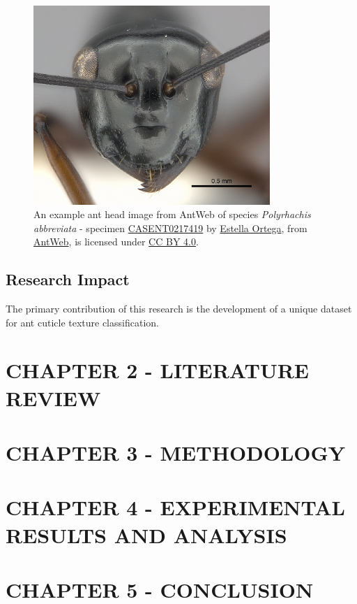 \documentclass[12pt]{article}
\begin{document}
\begin{figure}[ht]
    \centering
    \includegraphics[width=0.8\textwidth]{assets/images/CASENT0217419.jpg}
    \caption{ An example ant head image from AntWeb of species
        \textit{Polyrhachis abbreviata} - specimen
        \href{https://www.antweb.org/bigPicture.do?name=casent0217419&shot=h&number=1}{CASENT0217419}
        by \href{https://www.antweb.org/artist.do?id=92}{Estella Ortega}, from
        \href{https://www.antweb.org}{AntWeb}, is licensed under
        \href{https://creativecommons.org/licenses/by/4.0/}{CC BY 4.0}.}
    \label{fig:CASENT0217419}
\end{figure}

\subsection{Research Impact}

The primary contribution of this research is the development of a unique dataset
for ant cuticle texture classification.

\section{CHAPTER 2 - LITERATURE REVIEW}

\section{CHAPTER 3 - METHODOLOGY}

\section{CHAPTER 4 - EXPERIMENTAL RESULTS AND ANALYSIS}

\section{CHAPTER 5 - CONCLUSION}



\end{document}

